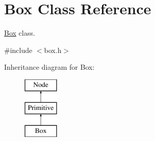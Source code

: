 \hypertarget{class_box}{
\section{\-Box \-Class \-Reference}
\label{class_box}
}


\hyperlink{class_box}{\-Box} class.  




{\ttfamily \#include $<$box.\-h$>$}

\-Inheritance diagram for \-Box\-:\begin{figure}[H]
\begin{center}
\leavevmode
\includegraphics[height=3.000000cm]{class_box}
\end{center}
\end{figure}
